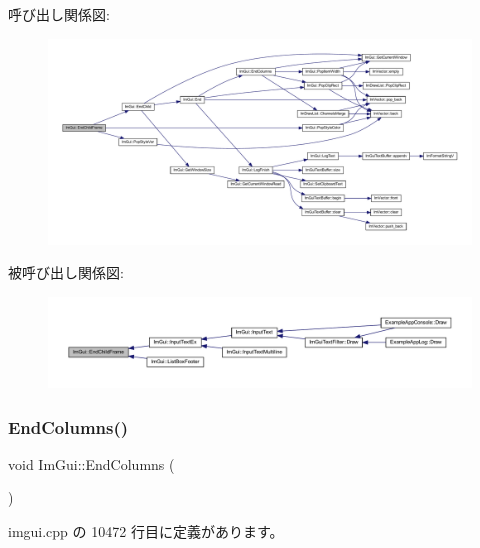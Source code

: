 呼び出し関係図\+:\nopagebreak
\begin{figure}[H]
\begin{center}
\leavevmode
\includegraphics[width=350pt]{namespace_im_gui_ac4bd9024554b5074805bc0ce3076c514_cgraph}
\end{center}
\end{figure}
被呼び出し関係図\+:\nopagebreak
\begin{figure}[H]
\begin{center}
\leavevmode
\includegraphics[width=350pt]{namespace_im_gui_ac4bd9024554b5074805bc0ce3076c514_icgraph}
\end{center}
\end{figure}
\mbox{\label{namespace_im_gui_af93bed3bce5475fe4d525d744f16aa20}} 
\subsubsection{\texorpdfstring{End\+Columns()}{EndColumns()}}
{\footnotesize\ttfamily void Im\+Gui\+::\+End\+Columns (\begin{DoxyParamCaption}{ }\end{DoxyParamCaption})}



 imgui.\+cpp の 10472 行目に定義があります。

